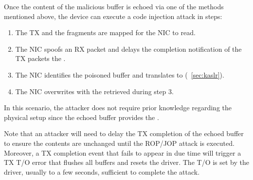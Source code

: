 
Once the content of the malicious buffer is echoed \DIFdelbegin {}\DIFdelend via one of the methods mentioned above\DIFdelbegin \DIFdel{)}\DIFdelend , the device can execute a code injection attack in \DIFdelbegin {}\DIFdelend \DIFaddbegin {}\DIFaddend steps:  
%
\begin{enumerate}[labelindent=3pt]
    \item The TX \data{} and the fragments are mapped for the NIC to read.
    \item The NIC spoofs an RX packet and delays the completion notification of the TX packets \DIFdelbegin {}\DIFdelend \DIFaddbegin {}\DIFaddend the \mabaf{} \DIFdelbegin {}\DIFdelend \DIFaddbegin {}\DIFaddend .
    \item The NIC identifies the poisoned buffer and translates \page{} to \kva{} (\DIFdelbegin {}\DIFdelend \DIFaddbegin {}\DIFaddend ~\ref{sec:kaslr}).
    \item The NIC overwrites \shinfo{} with the \kva{} retrieved during step 3. 
\end{enumerate}


In this scenario, the attacker does not require prior knowledge regarding the physical setup since the echoed buffer provides the \kva.  

Note that an attacker will need to delay the TX completion of the echoed buffer to ensure the contents are unchanged until the ROP/JOP attack is executed.
Moreover, a TX completion event that fails to appear in due time will trigger a TX T/O error that flushes all buffers and resets the driver. The T/O is set by the driver, usually to a few seconds, \DIFaddbegin {}\DIFaddend sufficient to complete the attack.



